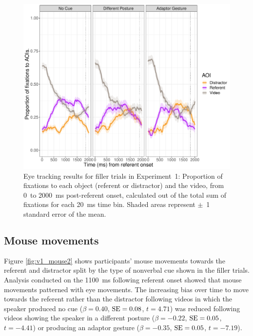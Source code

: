 \documentclass[a4paper,man,natbib]{apa6}
\newcommand{\resultsLM}[3]{$\beta = #1$, $\textnormal{SE} = #2$, $t #3$}
\begin{document}

\begin{figure}[Ht]
  \centering
	\includegraphics[width=\linewidth]{./img/e7_fixations_filler.pdf}
  \caption{Eye tracking results for filler trials in Experiment~1: Proportion of fixations to each object (referent or distractor) and the video, from 0~to 2000~ms post-referent onset, calculated out of the total sum of fixations for each 20~ms time bin. Shaded areas represent $\pm$~1 standard error of the mean.}
  \label{fig:v1_eye2}
\end{figure}

\subsection{Mouse movements}
Figure \ref{fig:v1_mouse2} shows participants' mouse movements towards the referent and distractor split by the type of nonverbal cue shown in the filler trials. 
Analysis conducted on the 1100~ms following referent onset showed that mouse movements patterned with eye movements.
The increasing bias over time to move towards the referent rather than the distractor following videos in which the speaker produced no cue (\resultsLM{0.40}{0.08}{=4.71}) was reduced following videos showing the speaker in a different posture (\resultsLM{-0.22}{0.05}{=-4.41}) or producing an adaptor gesture (\resultsLM{-0.35}{0.05}{=-7.19}).
\end{document}
